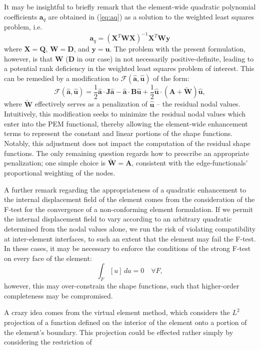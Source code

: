 \documentclass[12pt]{article}
\begin{document}
It may be insightful to briefly remark that the element-wide quadratic polynomial coefficients $\mathbf{a}_q$ are obtained in (\ref{eq:aq}) as a solution to the weighted least squares problem, i.e.
\begin{equation}
	\mathbf{a}_q = (\mathbf{X}^T \mathbf{W} \mathbf{X})^{-1} \mathbf{X}^T \mathbf{W} \mathbf{y}
\end{equation}
where $\mathbf{X} = \mathbf{Q}$, $\mathbf{W} = \mathbf{D}$, and $\mathbf{y} = \mathbf{u}$. The problem with the present formulation, however, is that $\mathbf{W}$ ($\mathbf{D}$ in our case) in not necessarily positive-definite, leading to a potential rank deficiency in the weighted least squares problem of interest. This can be remedied by a modification to $\mathcal{F} (\hat{\mathbf{a}}, \hat{\mathbf{u}})$ of the form:
\begin{equation}
        \mathcal{F} (\hat{\mathbf{a}}, \hat{\mathbf{u}}) = \frac{1}{2} \hat{\mathbf{a}} \cdot \mathbf{J} \hat{\mathbf{a}} - \hat{\mathbf{a}} \cdot \mathbf{B} \hat{\mathbf{u}} + \frac{1}{2} \hat{\mathbf{u}} \cdot (\mathbf{A} + \tilde{\mathbf{W}}) \hat{\mathbf{u}},
\end{equation}
where $\tilde{\mathbf{W}}$ effectively serves as a penalization of $\hat{\mathbf{u}}$ -- the residual nodal values. Intuitively, this modification seeks to minimize the residual nodal values which enter into the PEM functional, thereby allowing the element-wide enhancement terms to represent the constant and linear portions of the shape functions. Notably, this adjustment does not impact the computation of the residual shape functions. The only remaining question regards how to prescribe an appropriate penalization; one simple choice is $\tilde{\mathbf{W}} = \mathbf{A}$, consistent with the edge-functionals' proportional weighting of the nodes.

A further remark regarding the appropriateness of a quadratic enhancement to the internal displacement field of the element comes from the consideration of the F-test for the convergence of a non-conforming element formulation. If we permit the internal displacement field to vary according to an arbitrary quadratic determined from the nodal values alone, we run the risk of violating compatibility at inter-element interfaces, to such an extent that the element may fail the F-test. In these cases, it may be necessary to enforce the conditions of the strong F-test on every face of the element:
\begin{equation}
	\int_{F} \left[ u \right] \, da = 0 \quad \forall F,
\end{equation}
however, this may over-constrain the shape functions, such that higher-order completeness may be compromised.

A crazy idea comes from the virtual element method, which considers the $L^2$ projection of a function defined on the interior of the element onto a portion of the element's boundary. This projection could be effected rather simply by considering the restriction of 
\end{document}
